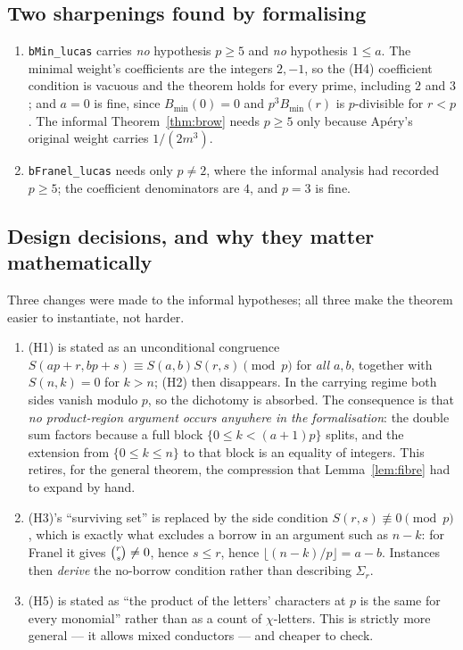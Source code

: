 \subsection{Two sharpenings found by formalising}

\begin{enumerate}[leftmargin=1.7em]
\item \texttt{bMin\_lucas} carries \emph{no} hypothesis $p\ge5$ and \emph{no} hypothesis
  $1\le a$. The minimal weight's coefficients are the integers $2,-1$, so the (H4)
  coefficient condition is vacuous and the theorem holds for every prime, including $2$
  and $3$; and $a=0$ is fine, since $B_{\min}(0)=0$ and $p^3B_{\min}(r)$ is $p$-divisible
  for $r<p$. The informal Theorem~\ref{thm:brow} needs $p\ge5$ only because Ap\'ery's
  original weight carries $1/(2m^3)$.
\item \texttt{bFranel\_lucas} needs only $p\ne2$, where the informal analysis had recorded
  $p\ge5$; the coefficient denominators are $4$, and $p=3$ is fine.
\end{enumerate}

\subsection{Design decisions, and why they matter mathematically}

Three changes were made to the informal hypotheses; all three make the theorem easier to
instantiate, not harder.

\begin{enumerate}[leftmargin=1.7em]
\item (H1) is stated as an unconditional congruence
  $S(ap+r,bp+s)\equiv S(a,b)S(r,s)\pmod p$ for \emph{all} $a,b$, together with
  $S(n,k)=0$ for $k>n$; (H2) then disappears. In the carrying regime both sides vanish
  modulo $p$, so the dichotomy is absorbed. The consequence is that \emph{no
  product-region argument occurs anywhere in the formalisation}: the double sum factors
  because a full block $\{0\le k<(a+1)p\}$ splits, and the extension from
  $\{0\le k\le n\}$ to that block is an equality of integers. This retires, for the general
  theorem, the compression that Lemma~\ref{lem:fibre} had to expand by hand.
\item (H3)'s ``surviving set'' is replaced by the side condition
  $S(r,s)\not\equiv0\pmod p$, which is exactly what excludes a borrow in an argument such
  as $n-k$: for Franel it gives $\binom{r}{s}\ne0$, hence $s\le r$, hence
  $\lfloor(n-k)/p\rfloor=a-b$. Instances then \emph{derive} the no-borrow condition rather
  than describing $\Sigma_r$.
\item (H5) is stated as ``the product of the letters' characters at $p$ is the same for
  every monomial'' rather than as a count of $\chi$-letters. This is strictly more
  general --- it allows mixed conductors --- and cheaper to check.
\end{enumerate}

